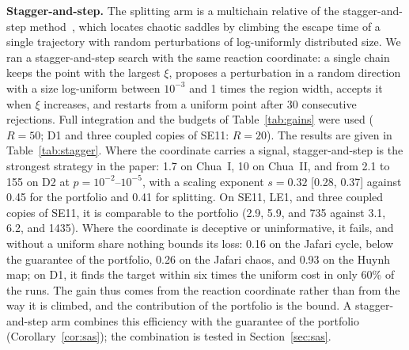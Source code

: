 \textbf{Stagger-and-step.} The splitting arm is a multichain relative of the stagger-and-step method~\cite{SweetNusseYorke2001}, which locates chaotic saddles by climbing the escape time of a single trajectory with random perturbations of log-uniformly distributed size. We ran a stagger-and-step search with the same reaction coordinate: a single chain keeps the point with the largest $\xi$, proposes a perturbation in a random direction with a size log-uniform between $10^{-3}$ and 1 times the region width, accepts it when $\xi$ increases, and restarts from a uniform point after 30 consecutive rejections. Full integration and the budgets of Table~\ref{tab:gains} were used ($R=50$; D1 and three coupled copies of SE11: $R=20$). The results are given in Table~\ref{tab:stagger}. Where the coordinate carries a signal, stagger-and-step is the strongest strategy in the paper: 1.7 on Chua~I, 10 on Chua~II, and from 2.1 to 155 on D2 at $p=10^{-2}$--$10^{-5}$, with a scaling exponent $s=0.32$ [0.28, 0.37] against 0.45 for the portfolio and 0.41 for splitting. On SE11, LE1, and three coupled copies of SE11, it is comparable to the portfolio (2.9, 5.9, and 735 against 3.1, 6.2, and 1435). Where the coordinate is deceptive or uninformative, it fails, and without a uniform share nothing bounds its loss: 0.16 on the Jafari cycle, below the guarantee of the portfolio, 0.26 on the Jafari chaos, and 0.93 on the Huynh map; on D1, it finds the target within six times the uniform cost in only 60\% of the runs. The gain thus comes from the reaction coordinate rather than from the way it is climbed, and the contribution of the portfolio is the bound. A stagger-and-step arm combines this efficiency with the guarantee of the portfolio (Corollary~\ref{cor:sas}); the combination is tested in Section~\ref{sec:sas}.

